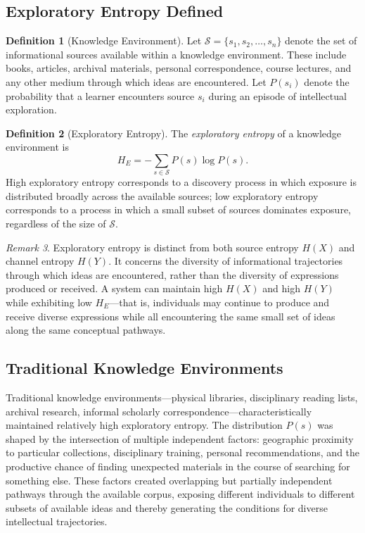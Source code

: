 \documentclass[12pt,a4paper]{article}
\theoremstyle{definition}
\newtheorem{definition}{Definition}[section]
\theoremstyle{plain}
\theoremstyle{remark}
\newtheorem{remark}[definition]{Remark}
\newcommand{\HE}{H_{E}}
\newcommand{\calS}{\mathcal{S}}
\begin{document}
\subsection{Exploratory Entropy Defined}

\begin{definition}[Knowledge Environment]
Let $\calS = \{s_1, s_2, \ldots, s_n\}$ denote the set of informational sources available
within a knowledge environment. These include books, articles, archival materials, personal
correspondence, course lectures, and any other medium through which ideas are encountered.
Let $P(s_i)$ denote the probability that a learner encounters source $s_i$ during an episode
of intellectual exploration.
\end{definition}

\begin{definition}[Exploratory Entropy]
The \emph{exploratory entropy} of a knowledge environment is
\[
\HE = -\sum_{s \in \calS} P(s)\log P(s).
\]
High exploratory entropy corresponds to a discovery process in which exposure is distributed
broadly across the available sources; low exploratory entropy corresponds to a process in
which a small subset of sources dominates exposure, regardless of the size of $\calS$.
\end{definition}

\begin{remark}
Exploratory entropy is distinct from both source entropy $H(X)$ and channel entropy $H(Y)$.
It concerns the diversity of informational trajectories through which ideas are encountered,
rather than the diversity of expressions produced or received. A system can maintain high
$H(X)$ and high $H(Y)$ while exhibiting low $\HE$---that is, individuals may continue to
produce and receive diverse expressions while all encountering the same small set of ideas
along the same conceptual pathways.
\end{remark}

\subsection{Traditional Knowledge Environments}

Traditional knowledge environments---physical libraries, disciplinary reading lists, archival
research, informal scholarly correspondence---characteristically maintained relatively high
exploratory entropy. The distribution $P(s)$ was shaped by the intersection of multiple
independent factors: geographic proximity to particular collections, disciplinary training,
personal recommendations, and the productive chance of finding unexpected materials in the
course of searching for something else. These factors created overlapping but partially
independent pathways through the available corpus, exposing different individuals to different
subsets of available ideas and thereby generating the conditions for diverse intellectual
trajectories.
\end{document}
